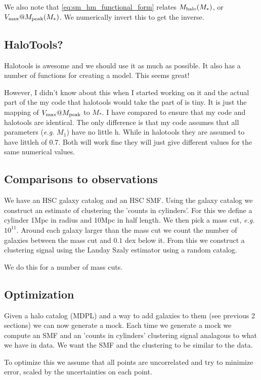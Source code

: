 \documentclass{article}
\makeatletter
\newcommand{\Mhalo}{\ensuremath{M_{\rm halo}}}
\newcommand{\vmp}{\ensuremath{V_{\rm max}@M_{\rm peak}}}
\newcommand{\Mstar}{\ensuremath{M_{\ast}}}
\newcommand{\eg}{{\it e.g.\/}}
\makeatother
\begin{document}
We also note that \autoref{eq:sm_hm_functional_form} relates $\Mhalo(\Mstar)$, or $\vmp(\Mstar)$. We numerically invert this to get the inverse.

\subsection{HaloTools?}

Halotools is awesome and we should use it as much as possible. It also has a number of functions for creating a \cite{Behroozi2010} model. This seems great!

However, I didn't know about this when I started working on it and the actual part of the my code that halotools would take the part of is tiny. It is just the mapping of \vmp{} to \Mstar{}.
I have compared to ensure that my code and halotools are identical. The only difference is that my code assumes that all parameters (\eg{} $M_1$) have no little h. While in halotools they are assumed to have littleh of 0.7. Both will work fine they will just give different values for the same numerical values.

\subsection{Comparisons to observations}

We have an HSC galaxy catalog and an HSC SMF. Using the galaxy catalog we construct an estimate of clustering the 'counts in cylinders'.
For this we define a cylinder 1Mpc in radius and 10Mpc in half length. We then pick a mass cut, \eg{} $10^{11}$.
Around each galaxy larger than the mass cut we count the number of galaxies between the mass cut and $0.1$ dex below it.
From this we construct a clustering signal using the Landay Szaly estimator using a random catalog.

We do this for a number of mass cuts.


\subsection{Optimization}
Given a halo catalog (MDPL) and a way to add galaxies to them (see previous 2 sections) we can now generate a mock. Each time we generate a mock we compute an SMF and an 'counts in cylinders' clustering signal analagous to what we have in data. We want the SMF and the clustering to be similar to the data.

To optimize this we assume that all points are uncorrelated and try to minimize error, scaled by the uncertainties on each point.
\end{document}
